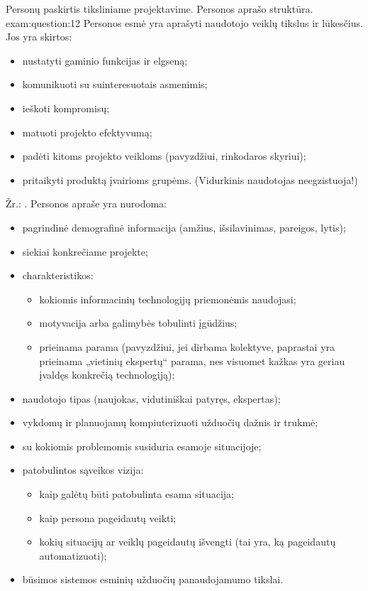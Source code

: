 \begin{question}{%
  Personų paskirtis tiksliniame projektavime. Personos aprašo struktūra.
  }{exam:question:12}
  Personos esmė yra aprašyti naudotojo veiklų tikslus ir lūkesčius. Jos yra 
  skirtos:
  \begin{itemize}
    \item nustatyti gaminio funkcijas ir elgseną;
    \item komunikuoti su suinteresuotais asmenimis;
    \item ieškoti kompromisų;
    \item matuoti projekto efektyvumą;
    \item padėti kitoms projekto veikloms (pavyzdžiui, rinkodaros skyriui);
    \item pritaikyti produktą įvairioms grupėms. (Vidurkinis
      naudotojas neegzistuoja!)
  \end{itemize}
  Žr.: \cite[39--47]{skaidres-5}.
  Personos apraše yra nurodoma\cite[49]{skaidres-5}:
  \begin{itemize}
    \item pagrindinė demografinė informacija (amžius, išsilavinimas,
      pareigos, lytis);
    \item siekiai konkrečiame projekte;
    \item charakteristikos:
      \begin{itemize}
        \item kokiomis informacinių technologijų priemonėmis naudojasi;
        \item motyvacija arba galimybės tobulinti įgūdžius;
        \item prieinama parama (pavyzdžiui, jei dirbama kolektyve,
          paprastai yra prieinama „vietinių ekspertų“ parama, nes
          visuomet kažkas yra geriau įvaldęs konkrečią technologiją);
      \end{itemize}
    \item naudotojo tipas (naujokas, vidutiniškai patyręs, ekspertas);
    \item vykdomų ir planuojamų kompiuterizuoti užduočių dažnis ir trukmė;
    \item su kokiomis problemomis susiduria esamoje situacijoje;
    \item patobulintos sąveikos vizija:
      \begin{itemize}
        \item kaip galėtų būti patobulinta esama situacija;
        \item kaip persona pageidautų veikti;
        \item kokių situacijų ar veiklų pageidautų išvengti (tai yra, ką
          pageidautų automatizuoti);
      \end{itemize}
    \item būsimos sistemos esminių užduočių panaudojamumo tikslai.
  \end{itemize}
\end{question}


